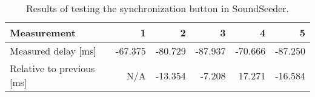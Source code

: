 \begin{table}[ht]
\centering
\begin{tabular}{|l|r|r|r|r|r|}
\hline
Measurement          		& 1       & 2       & 3       & 4       & 5       \\ \hline
Measured delay [ms]       	& -67.375 & -80.729 & -87.937 & -70.666 & -87.250 \\ \hline
Relative to previous [ms] 	& N/A     & -13.354 & -7.208  & 17.271  & -16.584  \\ \hline
\end{tabular}
\caption{Results of testing the synchronization button in SoundSeeder.}
\label{fig:soundseedersyncbutton}
\end{table}
